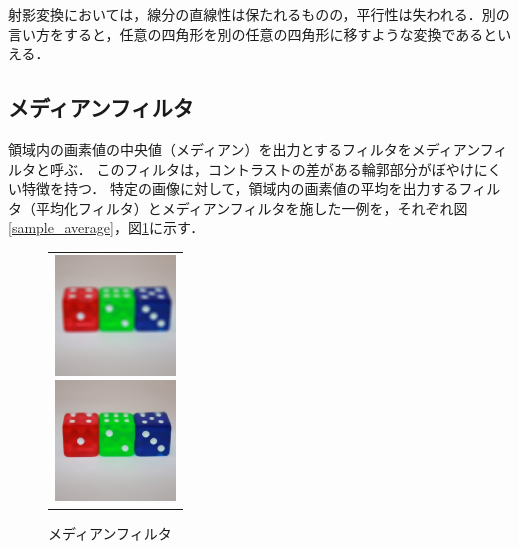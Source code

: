\documentclass[openright]{nitocs}
\numberwithin{equation}{section}
\begin{document}
                射影変換においては，線分の直線性は保たれるものの，平行性は失われる．別の言い方をすると，任意の四角形を別の任意の四角形に移すような変換であるといえる．

        \subsection{メディアンフィルタ}
            領域内の画素値の中央値（メディアン）を出力とするフィルタをメディアンフィルタと呼ぶ．
            このフィルタは，コントラストの差がある輪郭部分がぼやけにくい特徴を持つ．
            特定の画像に対して，領域内の画素値の平均を出力するフィルタ（平均化フィルタ）とメディアンフィルタを施した一例を，それぞれ図\ref{sample_average}，図\ref{sample_median}に示す．
            \begin{figure}[tb][tb] %
                \begin{center}
                  \begin{tabular}{c}
                    \begin{minipage}{0.5\hsize}
                      \begin{center}
                        \includegraphics[width=32mm,height=32mm]{sample_average.jpg}
                    \caption{平均化フィルタ}
                    \label{sample_average}
                      \end{center}
                    \end{minipage}
                    \begin{minipage}{0.5\hsize}
                      \begin{center}
                        \includegraphics[width=32mm,height=32mm]{sample_median.jpg}
                    \caption{メディアンフィルタ}
                    \label{sample_median}
                      \end{center}
                    \end{minipage}
                  \end{tabular}
                \end{center}
            \end{figure}
\end{document}
